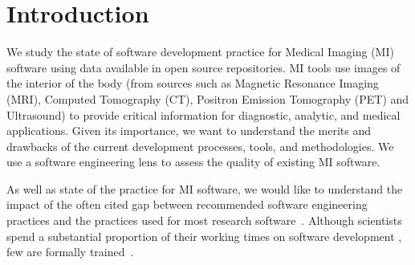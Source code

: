 \documentclass[draft, 12pt, 3p, times]{elsarticle} %
\begin{document}
\section{Introduction} \label{ch_intro}

We study the state of software development practice for Medical Imaging
(MI) software using data available in open source repositories.  MI tools use
images of the interior of the body (from sources such as Magnetic Resonance
Imaging (MRI), Computed Tomography (CT), Positron Emission Tomography (PET) and
Ultrasound) to provide critical information for diagnostic, analytic, and medical
applications. Given its importance, we want to understand the merits and
drawbacks of the current development processes, tools, and methodologies. We
use a software engineering lens to assess the quality of existing MI software.

As well as state of the practice for MI software, we would like to understand
the impact of the often cited gap between recommended software engineering
practices and the practices used for most research software~\cite{Storer2017}. Although
scientists spend a substantial proportion of their working times on software
development \cite{Hannay2009, Prabhu2011}, few are formally
trained~\cite{Hannay2009}.
\end{document}
